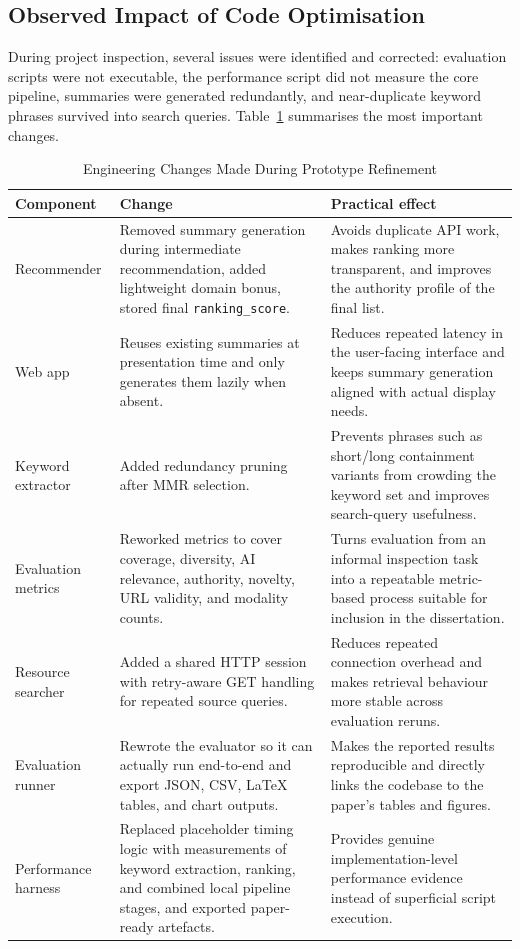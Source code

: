 \documentclass[10pt,journal,compsoc]{IEEEtran}
\begin{document}
\subsection{Observed Impact of Code Optimisation}

    During project inspection, several issues were identified and corrected: evaluation scripts were not executable, the performance script did not measure the core pipeline, summaries were generated redundantly, and near-duplicate keyword phrases survived into search queries. Table~\ref{tab:engineering_changes} summarises the most important changes.

\begin{table}[!t]
\renewcommand{\arraystretch}{1.2}
\caption{Engineering Changes Made During Prototype Refinement}
\label{tab:engineering_changes}
\centering
\scriptsize
\begin{tabular}{@{}p{2.3cm}p{4.6cm}p{7.9cm}@{}}
\hline\hline
Component & Change & Practical effect\\
\hline
Recommender & Removed summary generation during intermediate recommendation, added lightweight domain bonus, stored final \texttt{ranking\_score}. & Avoids duplicate API work, makes ranking more transparent, and improves the authority profile of the final list.\\
Web app & Reuses existing summaries at presentation time and only generates them lazily when absent. & Reduces repeated latency in the user-facing interface and keeps summary generation aligned with actual display needs.\\
Keyword extractor & Added redundancy pruning after MMR selection. & Prevents phrases such as short/long containment variants from crowding the keyword set and improves search-query usefulness.\\
Evaluation metrics & Reworked metrics to cover coverage, diversity, AI relevance, authority, novelty, URL validity, and modality counts. & Turns evaluation from an informal inspection task into a repeatable metric-based process suitable for inclusion in the dissertation.\\
Resource searcher & Added a shared HTTP session with retry-aware GET handling for repeated source queries. & Reduces repeated connection overhead and makes retrieval behaviour more stable across evaluation reruns.\\
Evaluation runner & Rewrote the evaluator so it can actually run end-to-end and export JSON, CSV, LaTeX tables, and chart outputs. & Makes the reported results reproducible and directly links the codebase to the paper's tables and figures.\\
Performance harness & Replaced placeholder timing logic with measurements of keyword extraction, ranking, and combined local pipeline stages, and exported paper-ready artefacts. & Provides genuine implementation-level performance evidence instead of superficial script execution.\\
\hline\hline
\end{tabular}
\end{table}
\end{document}
